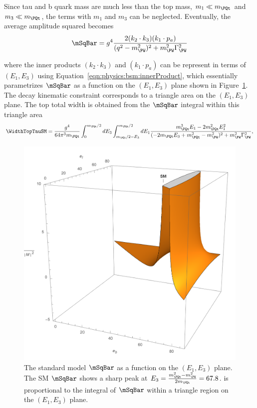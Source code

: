 \noindent Since tau and b quark mass are much less than the top mass, $m_1 \ll m_\PQt $ and $m_3 \ll m_\PQt$, the terms with $m_1$ and $m_3$ can be neglected. Eventually, the average amplitude squared becomes
\begin{equation}
	\mSqBar =  g^4 \frac{2  (  k_2 \cdot k_3) (  k_1 \cdot p_a) }{ (  q^2-m^2_{\PW})^2 +  m^2_{\PW} \Gamma^2_{\PW} }  
    \label{eqn:physics:bsm:smTopDecay:smTopDecay:m2}
\end{equation}

\noindent where the inner products $(  k_2 \cdot k_3)$ and $ (  k_1 \cdot p_a) $ can be represent in terms of $(E_1,E_3)$ using Equation~\ref{eqn:physics:bsm:innerProduct}, which essentially parametrizes $\mSqBar $ as a function on the $(E_1,E_3)$ plane shown in Figure~\ref{fig:physics:bsm:smTopDecay:smM2}. The decay kinematic constraint corresponds to a triangle area on the  $(E_1,E_3)$ plane. The top total width is obtained from the $\mSqBar $ integral within this triangle area
\begin{equation}
    \begin{split}
         \WidthTopTauSM = \frac{g^4}{64 \pi^3 m_\PQt} \int_{0}^{m_\PQt/2} d E_3 \int_{m_\PQt/2-E_3}^{m_\PQt/2} d E_1 \frac{m_\PQt^3 E_1 - 2 m_\PQt^2 E_1^2}{(-2 m_\PQt E_3  + m_\PQt^2  -m_\PW^2)^2 + m^2_{\PW} \Gamma^2_{\PW}},
    \end{split}
\end{equation}



\begin{figure}
\centering
    \includegraphics[width=0.4 \textwidth]{chapters/Physics/sectionBSM/figures/SM.png}
    \caption{The standard model $\mSqBar $ as a function on the $(E_1,E_3)$ plane. The SM $\mSqBar $  shows a sharp peak at $E_3 = \frac{m^2_\PQt - m^2_{\PW}}{2 m_\PQt} = 67.8 $\GeV. \WidthTopTauSM is proportional to the integral of $\mSqBar $ within a triangle region on the $(E_1,E_3)$ plane. }
    \label{fig:physics:bsm:smTopDecay:smM2}
\end{figure}







